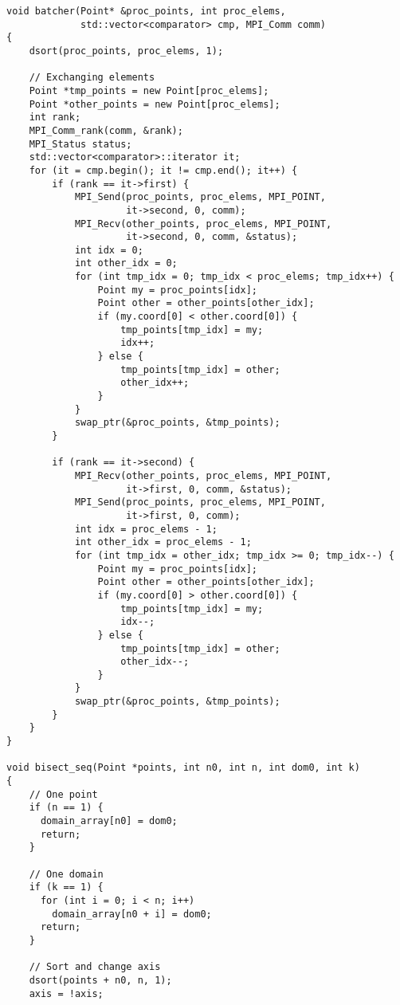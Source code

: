\documentclass[oneside,final,14pt]{extreport}
\begin{document}
\begin{verbatim}
void batcher(Point* &proc_points, int proc_elems,
             std::vector<comparator> cmp, MPI_Comm comm)
{
    dsort(proc_points, proc_elems, 1);

    // Exchanging elements
    Point *tmp_points = new Point[proc_elems];
    Point *other_points = new Point[proc_elems];
    int rank;
    MPI_Comm_rank(comm, &rank);
    MPI_Status status;
    std::vector<comparator>::iterator it;
    for (it = cmp.begin(); it != cmp.end(); it++) {
        if (rank == it->first) {
            MPI_Send(proc_points, proc_elems, MPI_POINT,
                     it->second, 0, comm);
            MPI_Recv(other_points, proc_elems, MPI_POINT,
                     it->second, 0, comm, &status);
            int idx = 0;
            int other_idx = 0;
            for (int tmp_idx = 0; tmp_idx < proc_elems; tmp_idx++) {
                Point my = proc_points[idx];
                Point other = other_points[other_idx];
                if (my.coord[0] < other.coord[0]) {
                    tmp_points[tmp_idx] = my;
                    idx++;
                } else {
                    tmp_points[tmp_idx] = other;
                    other_idx++;
                }
            }
            swap_ptr(&proc_points, &tmp_points);
        }

        if (rank == it->second) {
            MPI_Recv(other_points, proc_elems, MPI_POINT,
                     it->first, 0, comm, &status);
            MPI_Send(proc_points, proc_elems, MPI_POINT,
                     it->first, 0, comm);
            int idx = proc_elems - 1;
            int other_idx = proc_elems - 1;
            for (int tmp_idx = other_idx; tmp_idx >= 0; tmp_idx--) {
                Point my = proc_points[idx];
                Point other = other_points[other_idx];
                if (my.coord[0] > other.coord[0]) {
                    tmp_points[tmp_idx] = my;
                    idx--;
                } else {
                    tmp_points[tmp_idx] = other;
                    other_idx--;
                }
            }
            swap_ptr(&proc_points, &tmp_points);
        }
    }
}

void bisect_seq(Point *points, int n0, int n, int dom0, int k)
{
    // One point
    if (n == 1) {
      domain_array[n0] = dom0;
      return;
    }

    // One domain
    if (k == 1) {
      for (int i = 0; i < n; i++)
        domain_array[n0 + i] = dom0;
      return;
    }

    // Sort and change axis
    dsort(points + n0, n, 1);
    axis = !axis;


\end{verbatim}
\end{document}
